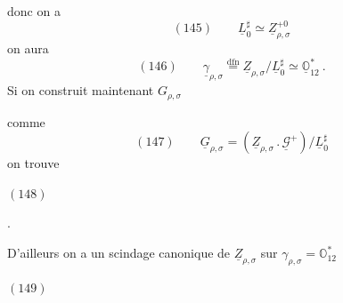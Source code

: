 
donc on a
\[
(145)\qquad\underline L_0^{\sharp}\simeq\underline Z_{\rho,\sigma}^{+0}
\]
on aura
\[
(146)\qquad\underline\gamma_{\rho,\sigma}\overset{\mathrm{dfn}}{=}
\underline Z_{\rho,\sigma}/\underline L_0^{\sharp}\simeq\underline{\mathbb O}_{12}^{*}\ .
\]
Si on construit maintenant \(G_{\rho,\sigma}\)


comme
\[
(147)\qquad\underline G_{\rho,\sigma}
=(\underline Z_{\rho,\sigma}\mathbin{.}\underline{\mathcal G}^{+})/\underline L_0^{\sharp}
\]
on trouve

\begin{samepage}
\((148)\)
\end{samepage}
.

D'ailleurs on a un scindage canonique
de \(\underline Z_{\rho,\sigma}\) sur \(\gamma_{\rho,\sigma}=\mathbb O_{12}^{*}\)

\begin{samepage}
\((149)\)
\end{samepage}


